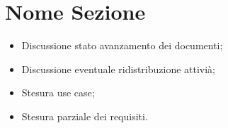 \documentclass[../template.tex]{subfiles}
\begin{document}
\section{Nome Sezione}
\begin{itemize}
	\item Discussione stato avanzamento dei documenti;
	\item Discussione eventuale ridistribuzione attivià;
	\item Stesura use case;
	\item Stesura parziale dei requisiti.
\end{itemize}
\end{document}
